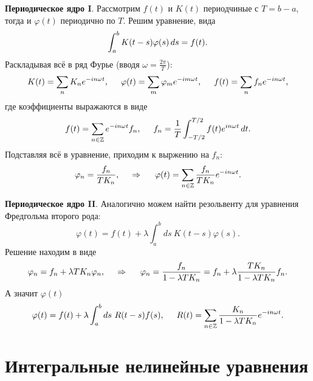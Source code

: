 \textbf{Периодическое ядро I}. Рассмотрим $f(t)$ и $K(t)$ периодчиные с $T = b-a$, тогда и $\varphi(t)$ периодично по $T$. Решим уравнение, вида
\begin{equation*}
	\int_{a}^{b} K(t-s) \varphi(s) \, d s = f(t).
\end{equation*}
Раскладывая всё в ряд Фурье (вводя $\omega = \frac{2\pi}{T}$):
\begin{equation*}
	K(t) = \sum_n K_n e^{-i n \omega t},
	\hspace{5 mm} 
	\varphi(t) = \sum_m \varphi_m e^{-i m \omega t},
	\hspace{5 mm} 
	f(t) = \sum_n f_n e^{-in \omega t},
\end{equation*}
где коэффициенты выражаются в виде
\begin{equation*}
	f(t) = \sum_{n \in \mathbb{Z}} e^{-in \omega t} f_n,
	\hspace{5 mm} f_n = \frac{1}{T} \int_{-T/2}^{T/2} f(t) e^{i n \omega t} \, d t.
\end{equation*}
Подставляя всё в уравнение, приходим к выржению на $f_n$:
\begin{equation}
	\varphi_n = \frac{f_n}{T K_n},
	\hspace{0.5cm} \Rightarrow \hspace{0.5cm}
	\varphi(t) = \sum_{n \in \mathbb{Z}} \frac{f_n}{T K_n} e^{-i n \omega t}.
\end{equation}

\textbf{Периодическое ядро II}. Аналогично можем найти резольвенту для уравнения Фредгольма второго рода:
\begin{equation*}
	\varphi(t) = f(t) +  \lambda \int_{a}^{b} ds\ K(t-s) \varphi(s).
\end{equation*}
Решение находим в виде
\begin{equation*}
	\varphi_n = f_n + \lambda T K_n \varphi_n,
	\hspace{0.5cm} \Rightarrow \hspace{0.5cm}
	\varphi_n  = \frac{f_n}{1-\lambda T K_n} = f_n + \lambda \frac{T K_n}{1-\lambda T K_n} f_n.
\end{equation*}
А значит $\varphi(t)$
\begin{equation}
	\varphi(t) = f(t) + \lambda \int_{a}^{b} ds\ R(t-s) f(s),
	\hspace{5 mm} 
	R(t) = \sum_{n \in \mathbb{Z}} \frac{K_n}{1-\lambda T K_n} e^{-i n \omega t}.
\end{equation}



\section{Интегральные нелинейные уравнения}


